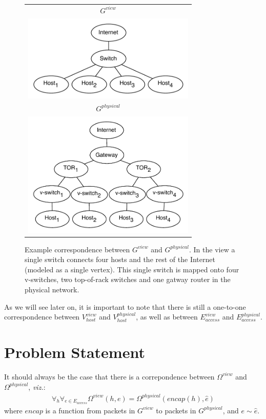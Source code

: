 \documentclass{sig-alternate-10pt}
\begin{document}
\begin{figure}[t]
\hspace{-10pt}
\begin{tabular}{c}
    $G^{view}$ \\
    \includegraphics[width=3.25in]{../diagrams/necula_views/app_view.pdf}  \\
    $G^{physical}$ \\
    \includegraphics[width=3.25in]{../diagrams/necula_views/physical_view.pdf}
\end{tabular}
\caption[]{\label{fig:view_and_physical} Example correspondence between
$G^{view}$ and $G^{physical}$. In the view a single switch connects 
four hosts and the rest of the Internet (modeled as a single vertex).
This single switch is mapped onto four v-switches, two top-of-rack switches 
and one gatway router in the physical network.}
\end{figure}

As we will see later on, it is important to note that there is still a one-to-one correspondence
between $V_{host}^{view}$ and $V_{host}^{physical}$, as well as between
$E_{access}^{view}$ and $E_{access}^{physical}$.

\section{Problem Statement}

It should always be the case that there is a correpondence between
$\Omega^{view}$ and $\Omega^{physical}$, {\it viz.}:
\begin{align*}
\forall_{h} \forall_{e \in E_{access}} \Omega^{view}(h,e) =
\Omega^{physical}(encap(h),\hat{e})
\end{align*}
where $encap$ is a function from packets in $G^{view}$ to packets in
$G^{physical}$, and $e \sim \hat{e}$.
\end{document}
